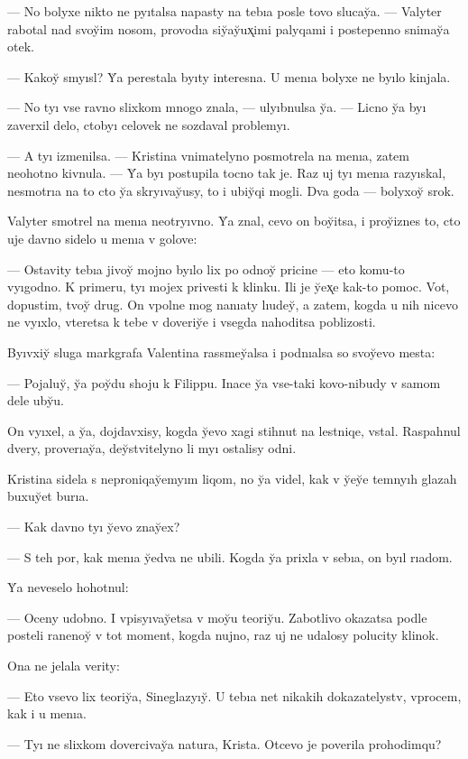 \documentclass[10pt]{book}
\begin{document}
— No bolyxe nikto ne pyıtalsa napasty na tebıa posle tovo slucay̆a. — Valyter rabotal nad svoy̆im nosom, provodıa siy̆ay̆ux̨imi palyqami i postepenno snimay̆a otek.

— Kakoy̆ smyısl? Y̆a perestala byıty interesna. U menıa bolyxe ne byılo kinjala.

— No tyı vse ravno slixkom mnogo znala, — ulyıbnulsa y̆a. — Licno y̆a byı zaverxil delo, ctobyı celovek ne sozdaval problemyı.

— A tyı izmenilsa. — Kristina vnimatelyno posmotrela na menıa, zatem neohotno kivnula. — Y̆a byı postupila tocno tak je. Raz uj tyı menıa razyıskal, nesmotrıa na to cto y̆a skryıvay̆usy, to i ubiy̆qi mogli. Dva goda — bolyxoy̆ srok.

Valyter smotrel na menıa neotryıvno. Y̆a znal, cevo on boy̆itsa, i proy̆iznes to, cto uje davno sidelo u menıa v golove:

— Ostavity tebıa jivoy̆ mojno byılo lix po odnoy̆ pricine — eto komu-to vyıgodno. K primeru, tyı mojex privesti k klinku. Ili je y̆ex̨e kak-to pomoc. Vot, dopustim, tvoy̆ drug. On vpolne mog nanıaty lıudey̆, a zatem, kogda u nih nicevo ne vyıxlo, vteretsa k tebe v doveriy̆e i vsegda nahoditsa poblizosti.

Byıvxiy̆ sluga markgrafa Valentina rassmey̆alsa i podnıalsa so svoy̆evo mesta:

— Pojaluy̆, y̆a poy̆du shoju k Filippu. Inace y̆a vse-taki kovo-nibudy v samom dele uby̆u.

On vyıxel, a y̆a, dojdavxisy, kogda y̆evo xagi stihnut na lestniqe, vstal. Raspahnul dvery, proverıay̆a, dey̆stvitelyno li myı ostalisy odni.

Kristina sidela s neproniqay̆emyım liqom, no y̆a videl, kak v y̆ey̆e temnyıh glazah buxuy̆et burıa.

— Kak davno tyı y̆evo znay̆ex?

— S teh por, kak menıa y̆edva ne ubili. Kogda y̆a prixla v sebıa, on byıl rıadom.

Y̆a neveselo hohotnul:

— Oceny udobno. I vpisyıvay̆etsa v moy̆u teoriy̆u. Zabotlivo okazatsa podle posteli ranenoy̆ v tot moment, kogda nujno, raz uj ne udalosy polucity klinok.

Ona ne jelala verity:

— Eto vsevo lix teoriy̆a, Sineglazyıy̆. U tebıa net nikakih dokazatelystv, vprocem, kak i u menıa.

— Tyı ne slixkom dovercivay̆a natura, Krista. Otcevo je poverila prohodimqu?
\end{document}
